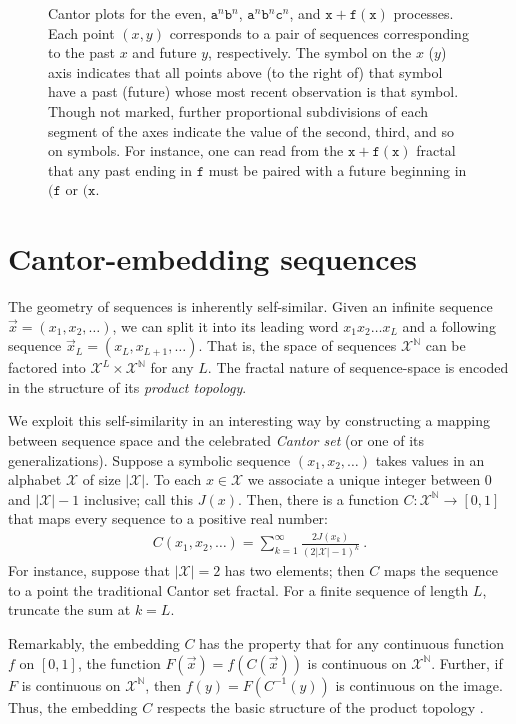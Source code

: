 \documentclass[draft,aps,pre,twocolumn,groupaddress,showkeys,nofootinbib,preprintnumbers,floatfix]{revtex4-2}
\begin{document}
\begin{figure}[ht]
\caption{Cantor plots for the even, $\mathtt{a}^n\mathtt{b}^n$,
	$\mathtt{a}^n\mathtt{b}^n\mathtt{c}^n$, and $\mathtt{x+f(x)}$ processes.
	Each point $(x,y)$ corresponds to a pair of sequences corresponding to the
	past $x$ and future $y$, respectively. The symbol on the $x$ ($y$) axis
	indicates that all points above (to the right of) that symbol have a past
	(future) whose most recent observation is that symbol. Though not marked,
	further proportional subdivisions of each segment of the axes indicate the
	value of the second, third, and so on symbols. For instance, one can read
	from the $\mathtt{x+f(x)}$ fractal that any past ending in $\mathtt{f}$
	must be paired with a future beginning in $\mathtt{(f}$ or $\mathtt{(x}$.
	}
\label{fig:cantor}
\end{figure}

\section{Cantor-embedding sequences}

The geometry of sequences is inherently self-similar. Given an infinite sequence
$\overrightarrow{x} = (x_1,x_2,\dots)$, we can split it into its leading word
$x_1 x_2 \dots x_L$ and a following sequence $\overrightarrow{x}_L =
(x_L,x_{L+1},\dots)$. That is, the space of sequences $\mathcal{X}^\mathbb{N}$
can be factored into $\mathcal{X}^L\times \mathcal{X}^\mathbb{N}$ for any $L$.
The fractal nature of sequence-space is encoded in the structure of its
\emph{product topology}.

We exploit this self-similarity in an interesting way by constructing a mapping
between sequence space and the celebrated \emph{Cantor set} (or one of its
generalizations). Suppose a symbolic sequence $(x_1,x_2,\dots)$ takes values in
an alphabet $\mathcal{X}$ of size $|\mathcal{X}|$. To each $x\in\mathcal{X}$ we
associate a unique integer between $0$ and $|\mathcal{X}|-1$ inclusive; call
this $J(x)$. Then, there is a function $C:\mathcal{X}^\mathbb{N}\rightarrow
[0,1]$ that maps every sequence to a positive real number:
\begin{align*}
  C(x_1,x_2,\dots) = \sum_{k=1}^\infty \frac{2J(x_k)}{(2|\mathcal{X}|-1)^k}
  ~.
\end{align*}
For instance, suppose that $|\mathcal{X}|=2$ has two elements; then $C$ maps the
sequence to a point the traditional Cantor set fractal. For a finite sequence of
length $L$, truncate the sum at $k=L$.

Remarkably, the embedding $C$ has the property that for any continuous function
$f$ on $[0,1]$, the function $F(\overrightarrow{x}) = f(C(\overrightarrow{x}))$
is continuous on $\mathcal{X}^\mathbb{N}$. Further, if $F$ is continuous on
$\mathcal{X}^\mathbb{N}$, then $f(y) = F(C^{-1}(y))$ is continuous on the image.
Thus, the embedding $C$ respects the basic structure of the product topology
\cite{Kurk03a}.
\end{document}
